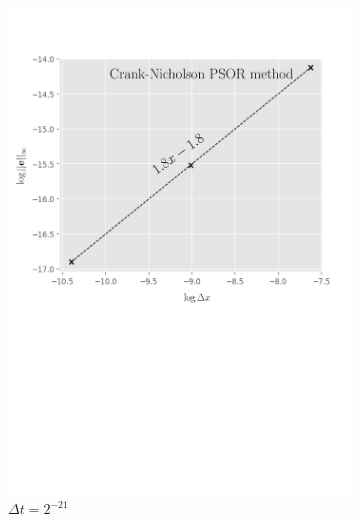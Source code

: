 \begin{figure}[H]
  \centering
  \begin{subfigure}{0.4\textwidth}
    \centering
    \includegraphics[width=\textwidth]{chapters/chapter5/ConvergenceSpaceCrankNicholsonLCP.pdf}
    \caption{$\Delta{x}=2^{-7},\dots,2^{-10}$}
    \caption*{$\Delta{t}=2^{-21}$}
    \label{fig:lcp:numericalresults:convergence_space_cranknicholson}
  \end{subfigure}
  \hspace{0.5cm}
  \begin{subfigure}{0.4\textwidth}
    \centering

\end{subfigure}
\end{figure}
